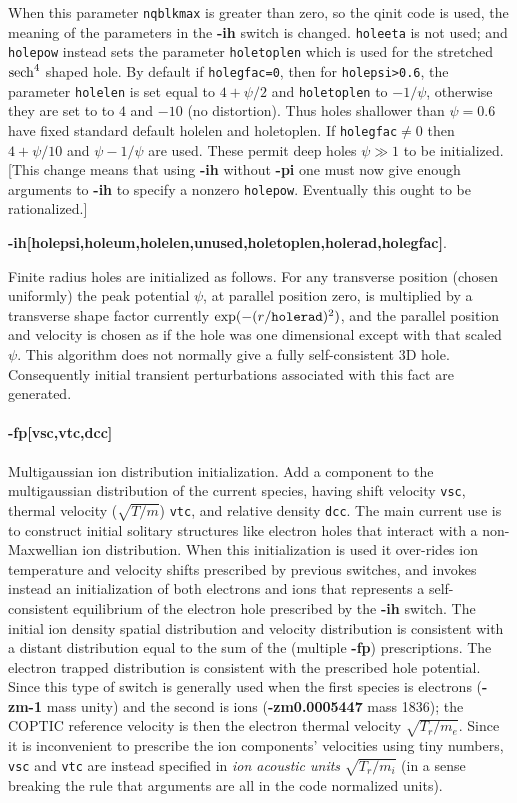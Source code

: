 \documentclass[12pt]{article}
\begin{document}
When this parameter \verb!nqblkmax! is greater than zero, so the qinit
code is used, the meaning of the parameters in the \textbf{-ih} switch
is changed. \verb!holeeta! is not used; and \verb!holepow! instead
sets the parameter \verb!holetoplen!  which is used for the stretched
${\rm sech}^4$ shaped hole. By default if \verb!holegfac=0!, then for
\verb!holepsi>0.6!, the parameter \verb!holelen! is set equal to
$4+\psi/2$ and \verb!holetoplen! to $-1/\psi$, otherwise they are set
to to $4$ and $-10$ (no distortion). Thus holes shallower than
$\psi=0.6$ have fixed standard default holelen and holetoplen. If
\verb!holegfac!$\not=0$ then $4+\psi/10$ and $\psi-1/\psi$ are
used. These permit deep holes $\psi\gg1$ to be initialized.  [This
change means that using {\bf -ih} without {\bf -pi} one must now give
enough arguments to {\bf -ih} to specify a nonzero
\verb!holepow!. Eventually this ought to be rationalized.]

\textbf{-ih[holepsi,holeum,holelen,unused,holetoplen,holerad,holegfac]}. 

\noindent Finite radius holes are initialized as follows. For any transverse
position (chosen uniformly) the peak potential $\psi$, at parallel
position zero, is multiplied by a transverse shape factor currently
$\exp(-(r/\verb!holerad!)^2)$, and the parallel position and velocity
is chosen as if the hole was one dimensional except with that scaled
$\psi$. This algorithm does not normally give a fully self-consistent
3D hole. Consequently initial transient perturbations associated with
this fact are generated.

\paragraph{-fp[vsc,vtc,dcc]} Multigaussian ion distribution
initialization. Add a component to the multigaussian distribution of
the current species, having shift velocity \verb!vsc!, thermal
velocity ($\sqrt{T/m}$) \verb!vtc!, and relative density
\verb!dcc!. The main current use is to construct initial solitary
structures like electron holes that interact with a non-Maxwellian ion
distribution. When this initialization is used it over-rides ion
temperature and velocity shifts prescribed by previous switches, and
invokes instead an initialization of both electrons and ions that
represents a self-consistent equilibrium of the electron hole
prescribed by the \textbf{-ih} switch. The initial ion density spatial
distribution and velocity distribution is consistent with a distant
distribution equal to the sum of the (multiple \textbf{-fp})
prescriptions. The electron trapped distribution is consistent with
the prescribed hole potential. Since this type of switch is generally
used when the first species is electrons (\textbf{-zm-1} mass unity)
and the second is ions (\textbf{-zm0.0005447} mass 1836); the COPTIC
reference velocity is then the electron thermal velocity
$\sqrt{T_r/m_e}$. Since it is inconvenient to prescribe the ion
components' velocities using tiny numbers, \verb!vsc! and \verb!vtc!
are instead specified in \emph{ion acoustic units} $\sqrt{T_r/m_i}$
(in a sense breaking the rule that arguments are all in the code
normalized units).
\end{document}
